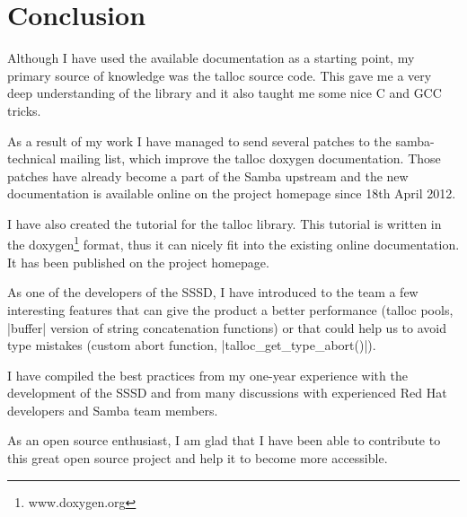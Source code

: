 \chapter{Conclusion}

Although I have used the available documentation as a starting point, my primary
source of knowledge was the talloc source code. This gave me a very deep
understanding of the library and it also taught me some nice C and GCC tricks.

As a result of my work I have managed to send several patches to the
samba-technical mailing list, which improve the talloc doxygen documentation.
Those patches have already become a part of the Samba upstream and the new
documentation is available online on the project homepage since 18th April 2012.

I have also created the tutorial for the talloc library. This tutorial is
written in the doxygen\footnote{www.doxygen.org} format, thus it can nicely
fit into the existing online documentation. It has been published on the project
homepage.

As one of the developers of the SSSD, I have introduced to the team a few
interesting features that can give the product a better performance (talloc
pools, |buffer| version of string concatenation functions) or that could help
us to avoid type mistakes (custom abort function, |talloc_get_type_abort()|).

I have compiled the best practices from my one-year experience with the
development of the SSSD and from many discussions with experienced Red Hat
developers and Samba team members.

As an open source enthusiast, I am glad that I have been able to contribute to
this great open source project and help it to become more accessible.
